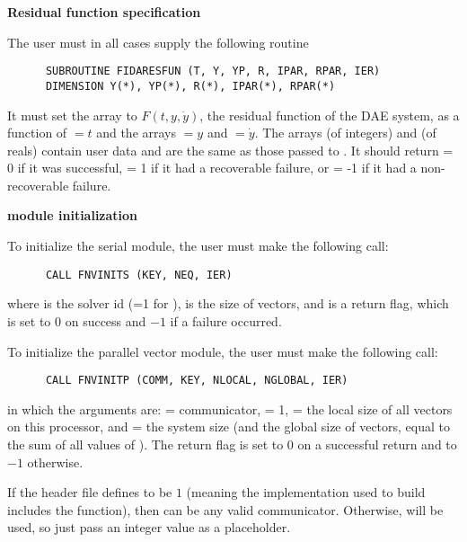 \begin{Steps}
  
\item {\bf Residual function specification}
  
  The user must in all cases supply the following {\F} routine
\begin{verbatim}
      SUBROUTINE FIDARESFUN (T, Y, YP, R, IPAR, RPAR, IER)
      DIMENSION Y(*), YP(*), R(*), IPAR(*), RPAR(*)
\end{verbatim}
  It must set the  array to $F(t,y,\dot{y})$, the residual function of the DAE
  system, as a function of  $ = t$ and the arrays  $ = y$ and
   $ = \dot{y}$.  
  The arrays  (of integers) and  (of reals) contain user data
  and are the same as those passed to .
  It should return  = 0 if it was successful,
   = 1 if it had a recoverable failure, or
   = -1 if it had a non-recoverable failure.
  
\item  {\bf {\nvector} module initialization}

  {\s} To initialize the serial {\nvector} module, the user must make the
  following call:
\begin{verbatim}
      CALL FNVINITS (KEY, NEQ, IER)
\end{verbatim}
  where 
   is the solver id (=1 for {\ida}),
   is the size of vectors, and
   is a return flag, which is set to $0$ on success and $-1$ 
  if a failure occurred.
  
  {\p} To initialize the parallel vector module, the user must make the
  following call:
\begin{verbatim}
      CALL FNVINITP (COMM, KEY, NLOCAL, NGLOBAL, IER)
\end{verbatim}
  in which the arguments are:  = {\mpi} communicator,  = 1,
   = the local size of all vectors on this processor, and
   = the system size (and the global size of vectors, equal to the
  sum of all values of ). The return flag  is
  set to $0$ on a successful return and to $-1$ otherwise.

  {\warn}If the header file  defines
   to be $1$ (meaning the {\mpi}
  implementation used to build {\sundials} includes the
   function), then  can be any valid
  {\mpi} communicator. Otherwise,  will be used, so
  just pass an integer value as a placeholder.


\end{Steps}
